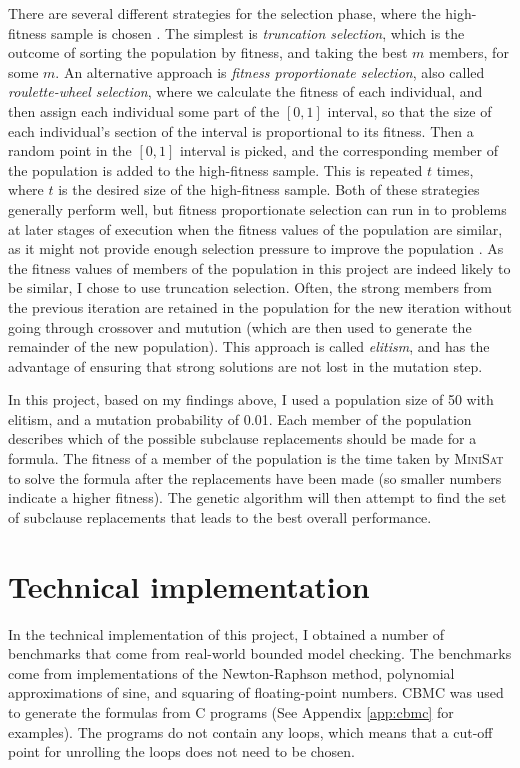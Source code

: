 \documentclass[proof,pdftex,11pt,a4,titlepage]{article}
\begin{document}
There are several different strategies for the selection phase, where the high-fitness sample is chosen \cite{Thierens:1994}. The simplest is \emph{truncation selection}, which is the outcome of sorting the population by fitness, and taking the best $m$ members, for some $m$. An alternative approach is \emph{fitness proportionate selection}, also called \emph{roulette-wheel selection}, where we calculate the fitness of each individual, and then assign each individual some part of the $[0,1]$ interval, so that the size of each individual's section of the interval is proportional to its fitness. Then a random point in the $[0,1]$ interval is picked, and the corresponding member of the population is added to the high-fitness sample. This is repeated $t$ times, where $t$ is the desired size of the high-fitness sample. Both of these strategies generally perform well, but fitness proportionate selection can run in to problems at later stages of execution when the fitness values of the population are similar, as it might not provide enough selection pressure to improve the population \cite{Whitley:1989}. As the fitness values of members of the population in this project are indeed likely to be similar, I chose to use truncation selection. Often, the strong members from the previous iteration are retained in the population for the new iteration without going through crossover and mutution (which are then used to generate the remainder of the new population). This approach is called \emph{elitism}, and has the advantage of ensuring that strong solutions are not lost in the mutation step.

In this project, based on my findings above, I used a population size of 50 with elitism, and a mutation probability of 0.01. Each member of the population describes which of the possible subclause replacements should be made for a formula. The fitness of a member of the population is the time taken by \textsc{MiniSat} to solve the formula after the replacements have been made (so smaller numbers indicate a higher fitness). The genetic algorithm will then attempt to find the set of subclause replacements that leads to the best overall performance.

\section{Technical implementation}

In the technical implementation of this project, I obtained a number of benchmarks that come from real-world bounded model checking. The benchmarks come from implementations of the Newton-Raphson method, polynomial approximations of sine, and squaring of floating-point numbers. CBMC was used to generate the formulas from C programs (See Appendix \ref{app:cbmc} for examples). The programs do not contain any loops, which means that a cut-off point for unrolling the loops does not need to be chosen.
\end{document}
